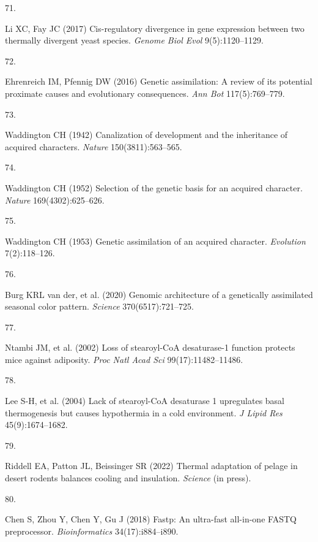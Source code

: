 \documentclass[9pt,twocolumn,twoside,lineno]{pnas-new}
\newlength{\cslhangindent}
\newlength{\csllabelwidth}
\newlength{\cslentryspacingunit} %
\newenvironment{CSLReferences}[2] %
 {%
  \setlength{\parindent}{0pt}
  \ifodd #1
  \let\oldpar\par
  \def\par{\hangindent=\cslhangindent\oldpar}
  \fi
  \setlength{\parskip}{#2\cslentryspacingunit}
 }%
 {}
\newcommand{\CSLLeftMargin}[1]{\parbox[t]{\csllabelwidth}{#1}}
\newcommand{\CSLRightInline}[1]{\parbox[t]{\linewidth - \csllabelwidth}{#1}\break}
\begin{document}
\begin{CSLReferences}{0}{0}
\leavevmode\hypertarget{ref-Li2017}{}%
\CSLLeftMargin{71. }
\CSLRightInline{Li XC, Fay JC (2017) {Cis-regulatory} divergence in gene
expression between two thermally divergent yeast species. \emph{Genome
Biol Evol} 9(5):1120--1129.}

\leavevmode\hypertarget{ref-Ehrenreich2016}{}%
\CSLLeftMargin{72. }
\CSLRightInline{Ehrenreich IM, Pfennig DW (2016) Genetic assimilation: A
review of its potential proximate causes and evolutionary consequences.
\emph{Ann Bot} 117(5):769--779.}

\leavevmode\hypertarget{ref-Waddington1942}{}%
\CSLLeftMargin{73. }
\CSLRightInline{Waddington CH (1942) Canalization of development and the
inheritance of acquired characters. \emph{Nature} 150(3811):563--565.}

\leavevmode\hypertarget{ref-Waddington1952}{}%
\CSLLeftMargin{74. }
\CSLRightInline{Waddington CH (1952) Selection of the genetic basis for
an acquired character. \emph{Nature} 169(4302):625--626.}

\leavevmode\hypertarget{ref-Waddington1953}{}%
\CSLLeftMargin{75. }
\CSLRightInline{Waddington CH (1953) Genetic assimilation of an acquired
character. \emph{Evolution} 7(2):118--126.}

\leavevmode\hypertarget{ref-Van_der_Burg2020}{}%
\CSLLeftMargin{76. }
\CSLRightInline{Burg KRL van der, et al. (2020) Genomic architecture of
a genetically assimilated seasonal color pattern. \emph{Science}
370(6517):721--725.}

\leavevmode\hypertarget{ref-Ntambi2002}{}%
\CSLLeftMargin{77. }
\CSLRightInline{Ntambi JM, et al. (2002) Loss of {stearoyl-CoA}
desaturase-1 function protects mice against adiposity. \emph{Proc Natl
Acad Sci} 99(17):11482--11486.}

\leavevmode\hypertarget{ref-Lee2004}{}%
\CSLLeftMargin{78. }
\CSLRightInline{Lee S-H, et al. (2004) Lack of {stearoyl-CoA} desaturase
1 upregulates basal thermogenesis but causes hypothermia in a cold
environment. \emph{J Lipid Res} 45(9):1674--1682.}

\leavevmode\hypertarget{ref-Riddell2021}{}%
\CSLLeftMargin{79. }
\CSLRightInline{Riddell EA, Patton JL, Beissinger SR (2022) Thermal
adaptation of pelage in desert rodents balances cooling and insulation.
\emph{Science} (in press).}

\leavevmode\hypertarget{ref-Chen2018}{}%
\CSLLeftMargin{80. }
\CSLRightInline{Chen S, Zhou Y, Chen Y, Gu J (2018) Fastp: An ultra-fast
all-in-one {FASTQ} preprocessor. \emph{Bioinformatics}
34(17):i884--i890.}


\end{CSLReferences}
\end{document}
